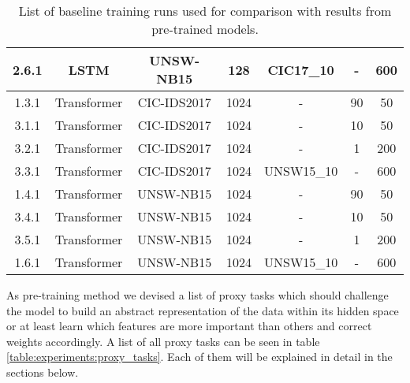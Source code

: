 \begin{table}[]
{\begin{tabular}{c c c c c c c}
		2.6.1 \label{ex_1_1_8}           & LSTM           & UNSW-NB15        & 128                                     & CIC17\_10	& -                    & 600                                           \\ \midrule
		1.3.1 \label{ex_1_2_1}           & Transformer    & CIC-IDS2017     & 1024                                     & -			& 90                   & 50                                            \\ \midrule
		3.1.1 \label{ex_1_2_2}           & Transformer    & CIC-IDS2017     & 1024                                     & -			& 10                   & 50                                            \\ \midrule
		3.2.1 \label{ex_1_2_3}           & Transformer    & CIC-IDS2017     & 1024                                     & -			& 1                    & 200                                           \\ \midrule
		3.3.1 \label{ex_1_2_4}           & Transformer    & CIC-IDS2017     & 1024                                     & UNSW15\_10	& -                    & 600                                           \\ \midrule
		1.4.1 \label{ex_1_2_5}           & Transformer    & UNSW-NB15        & 1024                                     & -			& 90                   & 50                                            \\ \midrule
		3.4.1 \label{ex_1_2_6}           & Transformer    & UNSW-NB15        & 1024                                     & -			& 10                   & 50                                            \\ \midrule
		3.5.1 \label{ex_1_2_7}           & Transformer    & UNSW-NB15        & 1024                                     & -			& 1                    & 200                                           \\ \midrule
		1.6.1 \label{ex_1_2_8}           & Transformer    & UNSW-NB15        & 1024                                     & UNSW15\_10	& -                    & 600                                           \\
	\end{tabular}}
	\caption{List of baseline training runs used for comparison with results from pre-trained models.}
	\label{table:experiments:baseline}
\end{table}

As pre-training method we devised a list of proxy tasks which should challenge the model to build an abstract representation of the data within its hidden space or at least learn which features are more important than others and correct weights accordingly. A list of all proxy tasks can be seen in table \ref{table:experiments:proxy_tasks}. Each of them will be explained in detail in the sections below.

